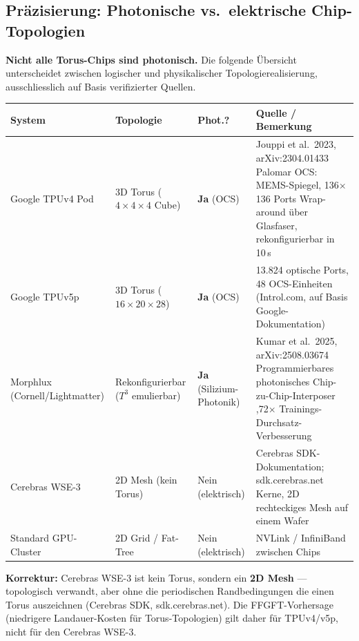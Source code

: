 
\subsection{Präzisierung: Photonische vs.\ elektrische Chip-Topologien}

\textbf{Nicht alle Torus-Chips sind photonisch.} Die folgende Übersicht
unterscheidet zwischen logischer und physikalischer Topologierealisierung,
ausschliesslich auf Basis verifizierter Quellen.

\begin{center}
\renewcommand{\arraystretch}{1.4}
{\footnotesize
\begin{tabular}{p{4.0cm}p{3.0cm}p{2.0cm}p{6.5cm}}
\toprule
\textbf{System} & \textbf{Topologie} & \textbf{Phot.?} & \textbf{Quelle / Bemerkung} \\
\midrule
Google TPUv4 Pod
  & 3D Torus ($4{\times}4{\times}4$ Cube)
  & \textbf{Ja} (OCS)
  & Jouppi et al.\ 2023, arXiv:2304.01433 \newline
    Palomar OCS: MEMS-Spiegel, 136$\times$136 Ports \newline
    Wrap-around über Glasfaser, rekonfigurierbar in 10\,s \\[4pt]
Google TPUv5p
  & 3D Torus ($16{\times}20{\times}28$)
  & \textbf{Ja} (OCS)
  & 13.824 optische Ports, 48 OCS-Einheiten \newline
    (Introl.com, auf Basis Google-Dokumentation) \\[4pt]
Morphlux (Cornell/Lightmatter)
  & Rekonfigurierbar ($T^3$ emulierbar)
  & \textbf{Ja} (Silizium-Photonik)
  & Kumar et al.\ 2025, arXiv:2508.03674 \newline
    Programmierbares photonisches Chip-zu-Chip-Interposer \newline
    1,72$\times$ Trainings-Durchsatz-Verbesserung \\[4pt]
Cerebras WSE-3
  & 2D Mesh (kein Torus)
  & Nein (elektrisch)
  & Cerebras SDK-Dokumentation; sdk.cerebras.net \newline
    900.000 Kerne, 2D rechteckiges Mesh auf einem Wafer \\[4pt]
Standard GPU-Cluster
  & 2D Grid / Fat-Tree
  & Nein (elektrisch)
  & NVLink / InfiniBand zwischen Chips \\
\bottomrule
\end{tabular}
}
\end{center}

\textbf{Korrektur:}
Cerebras WSE-3 ist kein Torus, sondern ein \textbf{2D Mesh} ---
topologisch verwandt, aber ohne die periodischen Randbedingungen die einen
Torus auszeichnen (Cerebras SDK, sdk.cerebras.net). Die FFGFT-Vorhersage (niedrigere
Landauer-Kosten für Torus-Topologien) gilt daher für TPUv4/v5p,
nicht für den Cerebras WSE-3.

